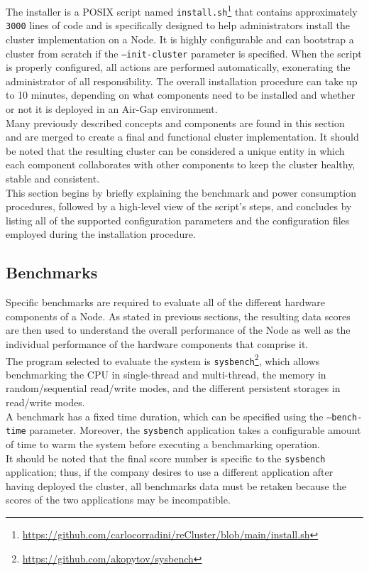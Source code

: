 The installer is a POSIX script named \texttt{install.sh}\footnote{\url{https://github.com/carlocorradini/reCluster/blob/main/install.sh}}
that contains approximately \texttt{3000} lines of code and is specifically
designed to help administrators install the cluster implementation on a Node. It
is highly configurable and can bootstrap a cluster from scratch if the \texttt{--init-cluster}
parameter is specified. When the script is properly configured, all actions are
performed automatically, exonerating the administrator of all responsibility.
The overall installation procedure can take up to 10 minutes, depending on what components
need to be installed and whether or not it is deployed in an Air-Gap environment.
\\ %
Many previously described concepts and components are found in this section and are
merged to create a final and functional cluster implementation. It should be
noted that the resulting cluster can be considered a unique entity in which each
component collaborates with other components to keep the cluster healthy, stable
and consistent. \\ %
This section begins by briefly explaining the benchmark and power consumption procedures,
followed by a high-level view of the script's steps, and concludes by listing all
of the supported configuration parameters and the configuration files employed during
the installation procedure.

\subsection{Benchmarks}
\label{subsec:implementation_installer_benchmarks}

Specific benchmarks are required to evaluate all of the different hardware
components of a Node. As stated in previous sections, the resulting data scores
are then used to understand the overall performance of the Node as well as the
individual performance of the hardware components that comprise it. \\ %
The program selected to evaluate the system is \texttt{sysbench}\footnote{\url{https://github.com/akopytov/sysbench}},
which allows benchmarking the CPU in single-thread and multi-thread, the memory in
random/sequential read/write modes, and the different persistent storages in
read/write modes. \\ %
A benchmark has a fixed time duration, which can be specified using the \texttt{--bench-time}
parameter. Moreover, the \texttt{sysbench} application takes a configurable amount
of time to warm the system before executing a benchmarking operation. \\ %
It should be noted that the final score number is specific to the \texttt{sysbench}
application; thus, if the company desires to use a different application after
having deployed the cluster, all benchmarks data must be retaken because the scores
of the two applications may be incompatible.

